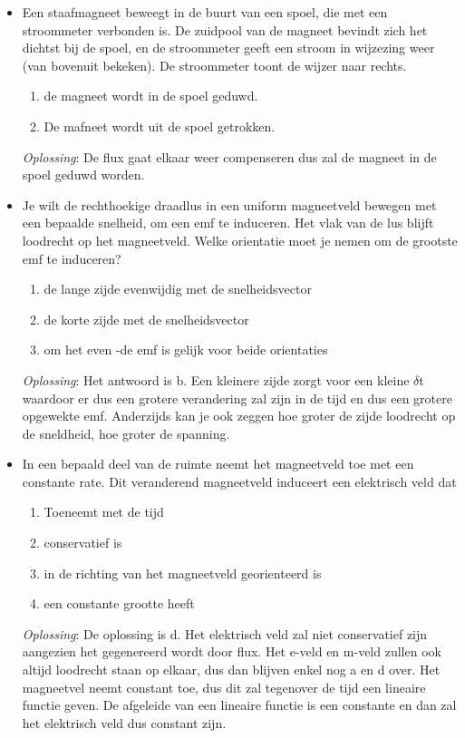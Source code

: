 \documentclass[12pt,a4paper]{article}
\begin{document}
\begin{itemize}
    	\item Een staafmagneet beweegt in de buurt van een spoel, die met een stroommeter verbonden is. De zuidpool van de magneet bevindt zich het dichtst bij de spoel, en de stroommeter geeft een stroom in wijzezing weer (van bovenuit bekeken). De stroommeter toont de wijzer naar rechts. 
    	\begin{enumerate}[label=\alph*]
    		\item de magneet wordt in de spoel geduwd.
    		\item De mafneet wordt uit de spoel getrokken.
    	\end{enumerate}
    	\textit{Oplossing}: De flux gaat elkaar weer compenseren dus zal de magneet in de spoel geduwd worden.
    	\item Je wilt de rechthoekige draadlus in een uniform magneetveld bewegen met een bepaalde snelheid, om een emf te induceren. Het vlak van de lus blijft loodrecht op het magneetveld. Welke orientatie moet je nemen om de grootste emf te induceren?
    	\begin{enumerate}[label=\alph*]
    		\item de lange zijde evenwijdig met de snelheidsvector
    		\item de korte zijde met de snelheidsvector
    		\item om het even -de emf is gelijk voor beide orientaties
    	\end{enumerate}
    	\textit{Oplossing}: Het antwoord is b. Een kleinere zijde zorgt voor een kleine $\delta$t waardoor er dus een grotere verandering zal zijn in de tijd en dus een grotere opgewekte emf. Anderzijds kan je ook zeggen hoe groter de zijde loodrecht op de sneldheid, hoe groter de spanning. 
    	\item In een bepaald deel van de ruimte neemt het magneetveld toe met een constante rate. Dit veranderend magneetveld induceert een elektrisch veld dat
    	\begin{enumerate}[label=\alph*]
    		\item Toeneemt met de tijd
    		\item conservatief is
    		\item in de richting van het magneetveld georienteerd is
    		\item een constante grootte heeft
    	\end{enumerate}
    	\textit{Oplossing}: De oplossing is d. Het elektrisch veld zal niet conservatief zijn aangezien het gegenereerd wordt door flux. Het e-veld en m-veld zullen ook altijd loodrecht staan op elkaar, dus dan blijven enkel nog a en d over. Het magneetvel neemt constant toe, dus dit zal tegenover de tijd een lineaire functie geven. De afgeleide van een lineaire functie is een constante en dan zal het elektrisch veld dus constant zijn. 

\end{itemize}
\end{document}
